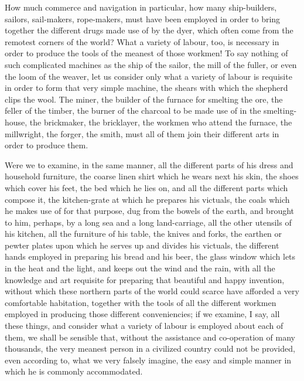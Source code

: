 How much commerce and navigation in particular, how many ship-builders, sailors, sail-makers, rope-makers, must have been employed in order to bring together the different drugs made use of by the dyer, which often come from the remotest corners of the world? What a variety of labour, too, is necessary in order to produce the tools of the meanest of those workmen! To say nothing of such complicated machines as the ship of the sailor, the mill of the fuller, or even the loom of the weaver, let us consider only what a variety of labour is requisite in order to form that very simple machine, the shears with which the shepherd clips the wool. The miner, the builder of the furnace for smelting the ore, the feller of the timber, the burner of the charcoal to be made use of in the smelting-house, the brickmaker, the bricklayer, the workmen who attend the furnace, the millwright, the forger, the smith, must all of them join their different arts in order to produce them.\par

Were we to examine, in the same manner, all the different parts of his dress and household furniture, the coarse linen shirt which he wears next his skin, the shoes which cover his feet, the bed which he lies on, and all the different parts which compose it, the kitchen-grate at which he prepares his victuals, the coals which he makes use of for that purpose, dug from the bowels of the earth, and brought to him, perhaps, by a long sea and a long land-carriage, all the other utensils of his kitchen, all the furniture of his table, the knives and forks, the earthen or pewter plates upon which he serves up and divides his victuals, the different hands employed in preparing his bread and his beer, the glass window which lets in the heat and the light, and keeps out the wind and the rain, with all the knowledge and art requisite for preparing that beautiful and happy invention, without which these northern parts of the world could scarce have afforded a very comfortable habitation, together with the tools of all the different workmen employed in producing those different conveniencies; if we examine, I say, all these things, and consider what a variety of labour is employed about each of them, we shall be sensible that, without the assistance and co-operation of many thousands, the very meanest person in a civilized country could not be provided, even according to, what we very falsely imagine, the easy and simple manner in which he is commonly accommodated.\par

